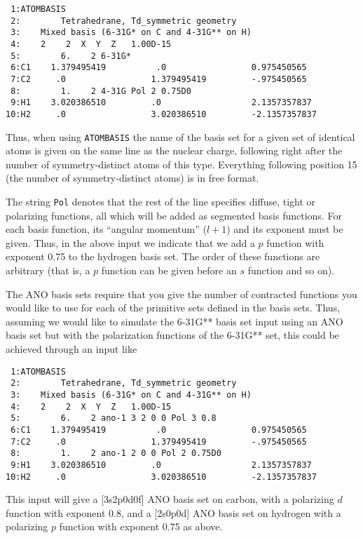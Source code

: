\begin{verbatim}
 1:ATOMBASIS
 2:        Tetrahedrane, Td_symmetric geometry
 3:    Mixed basis (6-31G* on C and 4-31G** on H)
 4:    2    2  X  Y  Z   1.00D-15
 5:        6.    2 6-31G*
 6:C1    1.379495419          .0                 0.975450565
 7:C2     .0                 1.379495419         -.975450565
 8:        1.    2 4-31G Pol 2 0.75D0
 9:H1    3.020386510         .0                  2.1357357837
10:H2     .0                 3.020386510         -2.1357357837
\end{verbatim}


Thus, when using {\tt ATOMBASIS} the name of the
basis set for a given
set of identical atoms is given on the same line as the nuclear
charge, following right after the number of symmetry-distinct atoms of
this type. Everything following position 15 (the number of
symmetry-distinct atoms) is in free format.

The string {\tt Pol} denotes that the rest of the line specifies
diffuse, tight or polarizing
functions, all which will be added as segmented basis functions.
For each basis function, its ``angular momentum'' ($l+1$) and its
exponent must be given. Thus, in the above input we indicate that
we add a $p$ function with exponent 0.75 to the hydrogen basis
set. The order of these functions are arbitrary (that is, a $p$
function can be given before an $s$ function and so on).

The ANO basis sets require that you give the number of contracted
functions you would like to use for each of the primitive sets defined
in the basis sets. Thus, assuming we would like to simulate the
6-31G** basis set input using an ANO basis set but with the
polarization functions of the 6-31G** set, this could be achieved
through an input like

\begin{verbatim}
 1:ATOMBASIS
 2:        Tetrahedrane, Td_symmetric geometry
 3:    Mixed basis (6-31G* on C and 4-31G** on H)
 4:    2    2  X  Y  Z   1.00D-15
 5:        6.    2 ano-1 3 2 0 0 Pol 3 0.8
 6:C1    1.379495419          .0                 0.975450565
 7:C2     .0                 1.379495419         -.975450565
 8:        1.    2 ano-1 2 0 0 Pol 2 0.75D0
 9:H1    3.020386510         .0                  2.1357357837
10:H2     .0                 3.020386510         -2.1357357837
\end{verbatim}

This input will give a [3s2p0d0f] ANO basis set
on carbon, with a
polarizing $d$ function with exponent 0.8, and a [2s0p0d] ANO basis
set on hydrogen with a polarizing $p$ function with exponent 0.75 as
above.

